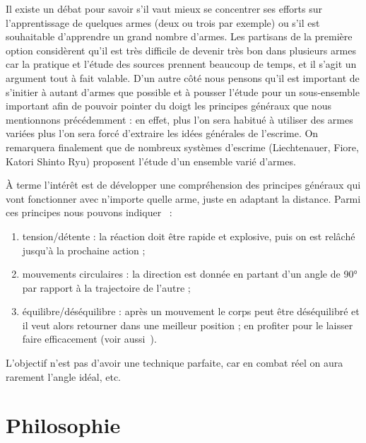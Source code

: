 Il existe un débat pour savoir s'il vaut mieux se concentrer ses efforts sur l'apprentissage de quelques armes (deux ou trois par exemple) ou s'il est souhaitable d'apprendre un grand nombre d'armes.
Les partisans de la première option considèrent qu'il est très difficile de devenir très bon dans plusieurs armes car la pratique et l'étude des sources prennent beaucoup de temps, et il s'agit un argument tout à fait valable.
D'un autre côté nous pensons qu'il est important de s'initier à autant d'armes que possible et à pousser l'étude pour un sous-ensemble important afin de pouvoir pointer du doigt les principes généraux que nous mentionnons précédemment : en effet, plus l'on sera habitué à utiliser des armes variées plus l'on sera forcé d'extraire les idées générales de l'escrime.
On remarquera finalement que de nombreux systèmes d'escrime (Liechtenauer, Fiore, Katori Shinto Ryu) proposent l'étude d'un ensemble varié d'armes.


À terme l'intérêt est de développer une compréhension des principes généraux qui vont fonctionner avec n'importe quelle arme, juste en adaptant la distance.
Parmi ces principes nous pouvons indiquer~\cite{enzi:dijon:messer_inner:2015} :
\begin{enumerate}
	\item tension/détente : la réaction doit être rapide et explosive, puis on est relâché jusqu'à la prochaine action ;
	\item mouvements circulaires : la direction est donnée en partant d'un angle de \ang{90} par rapport à la trajectoire de l'autre ;
	\item équilibre/déséquilibre : après un mouvement le corps peut être déséquilibré et il veut alors retourner dans une meilleur position ; en profiter pour le laisser faire efficacement (voir aussi~\cite{guidoux:dijon:thibault:2015}).
\end{enumerate}
L'objectif n'est pas d'avoir une technique parfaite, car en combat réel on aura rarement l'angle idéal, etc.


\section{Philosophie}


